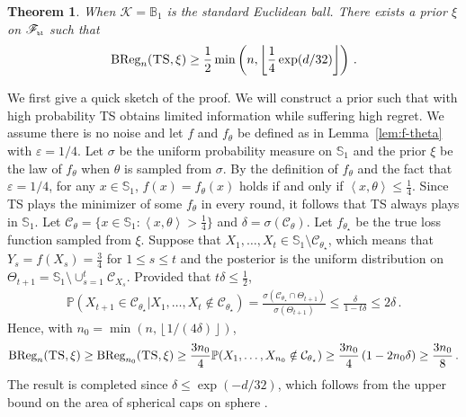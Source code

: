 \documentclass[letter, 12pt]{report}
\newcommand{\pb}{\text{\tiny\texttt{b}}}
\newcommand{\pl}{\text{\tiny\texttt{l}}}
\newcommand{\floor}[1]{\left\lfloor #1 \right\rfloor}
\newcommand{\ip}[1]{\left \langle #1 \right \rangle}
\newcommand{\BReg}{\textrm{BReg}}
\newcommand{\sphere}{\mathbb{S}}
\newcommand{\ball}{\mathbb{B}}
\newcommand{\cK}{\mathcal K}
\newcommand{\cC}{\mathcal C}
\newcommand{\sF}{\mathscr F}
\newcommand{\bbP}{\mathbb P}
\newcommand{\1}{\mathbf{1}}
\newcommand{\ts}{\textsc{TS}\xspace}
\renewcommand{\epsilon}{\varepsilon}
\theoremstyle{plain}
\newtheorem{theorem}{Theorem}
\theoremstyle{definition}
\theoremstyle{remark}
\begin{document}
\begin{theorem}\label{thm:ts-lower}
    When $\cK = \ball_1$ is the standard Euclidean ball.
    There exists a prior $\xi$ on $\sF_{\pb\pl}$ such that
    \begin{align*}
        \BReg_n(\ts, \xi) \geq \frac12 \min\left(n, \floor{\frac{1}{4} \exp(d/32)}\right)\,.
    \end{align*}
\end{theorem}

We first give a quick sketch of the proof.
We will construct a prior such that with high probability \ts{} obtains limited information while suffering high regret.
We assume there is no noise and let $f$ and $f_\theta$ be defined as in Lemma~\ref{lem:f-theta} with $\epsilon = 1/4$.
Let $\sigma$ be the uniform probability measure on $\sphere_1$ and
the prior $\xi$ be the law of $f_\theta$ when $\theta$ is sampled from $\sigma$.
By the definition of $f_\theta$ and the fact that $\epsilon = 1/4$, for any $x \in \sphere_1$,
$f(x) = f_\theta(x)$ holds if and only if $\ip{x, \theta} \leq \frac{1}{4}$.
Since \ts{} plays the minimizer of some $f_\theta$ in every round, it follows that \ts{} always plays in $\sphere_1$.
Let $\cC_\theta = \{x \in \sphere_1 : \ip{x, \theta} > \frac{1}{4}\}$ and $\delta = \sigma(\cC_\theta)$.
Let $f_{\theta_\star}$ be the true loss function sampled from $\xi$.
Suppose that $X_1,\ldots,X_t \in \sphere_1 \setminus \cC_{\theta_\star}$,
which means that $Y_s = f(X_s) = \frac{3}{4}$ for $1 \leq s \leq t$ and
the posterior is the uniform distribution on $\Theta_{t+1} = \sphere_1 \setminus \cup_{s=1}^t \cC_{X_s}$.
Provided that $t \delta \leq \frac{1}{2}$,
\begin{align*}
    \bbP(X_{t+1} \in \cC_{\theta_\star}|X_1,\ldots,X_t \notin \cC_{\theta_\star})
    = \frac{\sigma(\cC_{\theta_\star} \cap \Theta_{t+1})}{\sigma(\Theta_{t+1})}
    \leq \frac{\delta}{1 - t \delta}
    \leq 2\delta \,.
\end{align*}
Hence, with $n_0 = \min(n, \floor{1/(4\delta)})$,
\begin{align*}
    \BReg_n(\ts, \xi)
    \geq \BReg_{n_0}(\ts, \xi) \geq
    \frac{3n_0}{4} \bbP(X_1,\ldots,X_{n_0} \notin \cC_{\theta_\star}) \geq \frac{3n_0}{4} \left(1 - 2n_0 \delta\right) \geq \frac{3n_0}{8} \,.
\end{align*}
The result is completed since $\delta \leq \exp(-d/32)$, which follows
from the upper bound on the area of spherical caps on sphere \citep[Theorem B.1]{tkocz2018asymptotic}.
\end{document}
